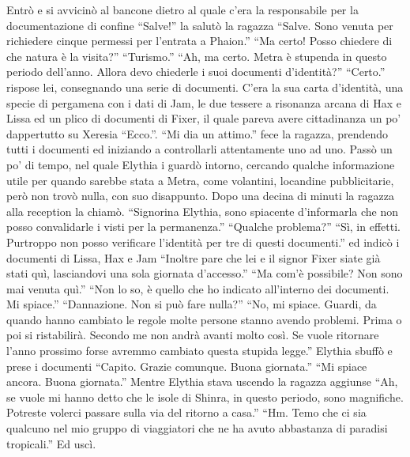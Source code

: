     Entrò e si avvicinò al bancone dietro al quale c'era la responsabile
    per la documentazione di confine ``Salve!'' la salutò la ragazza
    ``Salve. Sono venuta per richiedere cinque permessi per l'entrata a
    Phaion.'' ``Ma certo! Posso chiedere di che natura è la visita?''
    ``Turismo.'' ``Ah, ma certo. Metra è stupenda in questo periodo
    dell'anno. Allora devo chiederle i suoi documenti d'identità?''
    ``Certo.'' rispose lei, consegnando una serie di documenti. C'era la
    sua carta d'identità, una specie di pergamena con i dati di Jam, le due
    tessere a risonanza arcana di Hax e Lissa ed un plico di documenti di
    Fixer, il quale pareva avere cittadinanza un po' dappertutto su
    Xeresia ``Ecco.''. ``Mi dia un attimo.'' fece la ragazza, prendendo
    tutti i documenti ed iniziando a controllarli attentamente uno ad uno.
    Passò un po' di tempo, nel quale Elythia i guardò intorno, cercando
    qualche informazione utile per quando sarebbe stata a Metra, come
    volantini, locandine pubblicitarie, però non trovò nulla, con suo
    disappunto. Dopo una decina di minuti la ragazza alla reception la
    chiamò. ``Signorina Elythia, sono spiacente d'informarla che non posso
    convalidarle i visti per la permanenza.'' ``Qualche problema?'' ``Sì,
    in effetti. Purtroppo non posso verificare l'identità per tre di questi
    documenti.'' ed indicò i documenti di Lissa, Hax e Jam ``Inoltre pare
    che lei e il signor Fixer siate già stati quì, lasciandovi una sola
    giornata d'accesso.'' ``Ma com'è possibile? Non sono mai venuta quì.''
    ``Non lo so, è quello che ho indicato all'interno dei documenti. Mi
    spiace.'' ``Dannazione. Non si può fare nulla?'' ``No, mi spiace.
    Guardi, da quando hanno cambiato le regole molte persone stanno avendo
    problemi. Prima o poi si ristabilirà. Secondo me non andrà avanti molto
    così. Se vuole ritornare l'anno prossimo forse avremmo cambiato questa
    stupida legge.'' Elythia sbuffò e prese i documenti ``Capito. Grazie
    comunque. Buona giornata.'' ``Mi spiace ancora. Buona giornata.''
    Mentre Elythia stava uscendo la ragazza aggiunse ``Ah, se vuole mi
    hanno detto che le isole di Shinra, in questo periodo, sono magnifiche.
    Potreste volerci passare sulla via del ritorno a casa.'' ``Hm. Temo che
    ci sia qualcuno nel mio gruppo di viaggiatori che ne ha avuto
    abbastanza di paradisi tropicali.'' Ed uscì.

